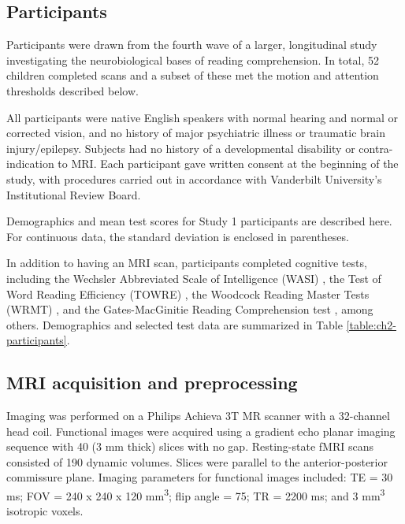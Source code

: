\subsection{Participants}

Participants were drawn from the fourth wave of a larger, longitudinal study investigating the neurobiological bases of reading comprehension. In total, 52 children completed scans and a subset of these met the motion and attention thresholds described below.

All participants were native English speakers with normal hearing and normal or corrected vision, and no history of major psychiatric illness or traumatic brain injury/epilepsy. Subjects had no history of a developmental disability or contra-indication to MRI.  Each participant gave written consent at the beginning of the study, with procedures carried out in accordance with Vanderbilt University’s Institutional Review Board.

\begin{table}
    \renewcommand{\tabcolsep}{0.09cm}
    \centering
    
    \caption[Participant demographics for Study 1]{Demographics and mean test scores for Study 1 participants are described here. For continuous data, the standard deviation is enclosed in parentheses.}
    \label{table:ch2-participants}
\end{table}

In addition to having an MRI scan, participants completed cognitive tests, including the Wechsler Abbreviated Scale of Intelligence (WASI) \citep{Kaplan1999}, the Test of Word Reading Efficiency (TOWRE) \citep{Torgesen2012}, the Woodcock Reading Master Tests (WRMT) \citep{Woodcock1998}, and the Gates-MacGinitie Reading Comprehension test \citep{MacGinitie2000}, among others. Demographics and selected test data are summarized in Table \ref{table:ch2-participants}.

\subsection{MRI acquisition and preprocessing}

Imaging was performed on a Philips Achieva 3T MR scanner with a 32-channel head coil. Functional images were acquired using a gradient echo planar imaging sequence with 40 (3 mm thick) slices with no gap. Resting-state fMRI scans consisted of 190 dynamic volumes. Slices were parallel to the anterior-posterior commissure plane. Imaging parameters for functional images included: TE = 30 ms; FOV = 240 x 240 x 120 mm\textsuperscript{3}; flip angle = 75\degree; TR = 2200 ms; and 3 mm\textsuperscript{3} isotropic voxels.

